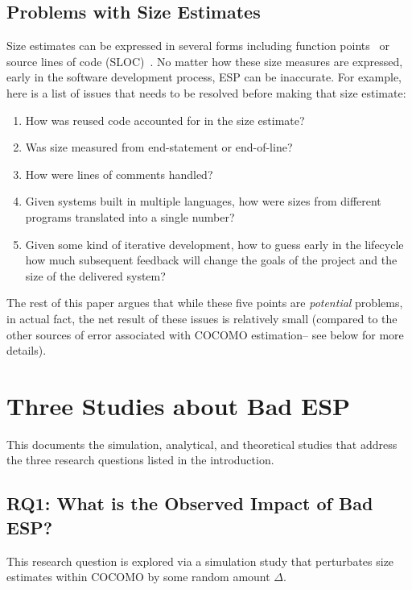 \documentclass[final,twocolumn,5p]{elsarticle}
\newcommand{\be}{\begin{enumerate}}
\newcommand{\ee}{\end{enumerate}}
\theoremstyle{break}
\begin{document}
  \subsection{Problems with Size Estimates}\label{sect:probs}

Size estimates can be expressed in several
forms including function points~\cite{Albrecht83} or  source lines of code (SLOC)~\cite{boehm81}.
No matter how  these size measures are expressed, early in the software development process,
ESP can be inaccurate. For example, here is a list of issues that needs to be resolved before making that
size estimate:
\be
\item How was reused code accounted for in the size estimate?
\item  Was size measured from end-statement or end-of-line?
\item How were lines of comments handled?
\item Given systems built in multiple languages, how were sizes from different programs translated
  into a single number?
\item
  Given some kind of iterative development, how to guess early in the lifecycle
  how much subsequent  feedback will change
  the goals of the project and the size of the delivered system?
  \ee
  The rest of this paper argues that while these five points are {\em potential} problems, in actual fact,
  the net result of these issues is relatively  small (compared to the other sources of error associated with
  COCOMO estimation-- see below for more details).

\section{Three Studies about Bad ESP}
This documents the simulation, analytical, and theoretical studies that address the three
research questions listed in the introduction.
\subsection{RQ1: What is the Observed Impact of Bad ESP?}\label{sect:rq1}
This research question is explored via  a simulation study that
perturbates  size estimates within COCOMO by some random amount $\Delta$.
\end{document}
